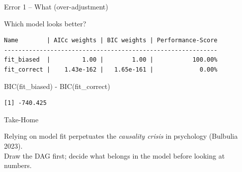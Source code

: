 \documentclass[
  ignorenonframetext,
  aspectratio=169,
]{beamer}
\newenvironment{Shaded}{\begin{snugshade}}{\end{snugshade}}
\newcommand{\FunctionTok}[1]{\textcolor[rgb]{0.28,0.35,0.67}{#1}}
\newcommand{\NormalTok}[1]{\textcolor[rgb]{0.00,0.23,0.31}{#1}}
\newcommand{\SpecialCharTok}[1]{\textcolor[rgb]{0.37,0.37,0.37}{#1}}
\begin{document}
\begin{frame}[fragile]{Error 1 -- What (over-adjustment)}
\begin{block}{Which model looks better?}
\begin{verbatim}
Name        | AICc weights | BIC weights | Performance-Score
------------------------------------------------------------
fit_biased  |         1.00 |        1.00 |           100.00%
fit_correct |    1.43e-162 |   1.65e-161 |             0.00%
\end{verbatim}

\begin{Shaded}
\begin{Highlighting}[]
\FunctionTok{BIC}\NormalTok{(fit\_biased) }\SpecialCharTok{{-}} \FunctionTok{BIC}\NormalTok{(fit\_correct)}
\end{Highlighting}
\end{Shaded}

\begin{verbatim}
[1] -740.425
\end{verbatim}
\end{block}

\begin{block}{Take-Home}
\label{take-home}
\begin{tcolorbox}[enhanced jigsaw, toprule=.15mm, leftrule=.75mm, bottomtitle=1mm, colbacktitle=quarto-callout-important-color!10!white, rightrule=.15mm, bottomrule=.15mm, left=2mm, breakable, coltitle=black, arc=.35mm, toptitle=1mm, title=\textcolor{quarto-callout-important-color}{\faExclamation}\hspace{0.5em}{Important}, colback=white, opacityback=0, titlerule=0mm, opacitybacktitle=0.6, colframe=quarto-callout-important-color-frame]

Relying on model fit perpetuates the \emph{causality crisis} in
psychology (Bulbulia 2023).\\
Draw the DAG first; decide what belongs in the model before looking at
numbers.

\end{tcolorbox}
\end{block}


\end{frame}
\end{document}

